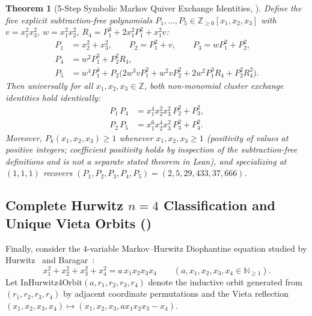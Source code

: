 \documentclass[11pt,reqno]{amsart}
\theoremstyle{plain}
\newtheorem{theorem}{Theorem}[section]
\theoremstyle{definition}
\newcommand{\ZZ}{\mathbb{Z}}
\newcommand{\NN}{\mathbb{N}}
\newcommand{\code}[1]{\texttt{\detokenize{#1}}}
\begin{document}
\begin{theorem}[5-Step Symbolic Markov Quiver Exchange Identities, \code{T3d}]
\label{thm:t3d}
Define the five explicit subtraction-free polynomials $P_1, \dots, P_5 \in \ZZ_{\ge 0}[x_1, x_2, x_3]$ with $v = x_1^2 x_3^2$, $w = x_1^2 x_2^2$, $R_4 = P_1^3 + 2 x_1^2 P_1^2 + x_1^2 v$:
\begin{align*}
  P_1 &= x_2^2 + x_3^2, \qquad P_2 = P_1^2 + v, \qquad P_3 = w P_1^2 + P_2^2, \\
  P_4 &= w^2 P_1^3 + P_2^2 R_4, \\
  P_5 &= w^4 P_1^4 + P_2\bigl(2 w^3 v P_1^2 + w^2 v P_2^2 + 2 w^2 P_1^3 R_4 + P_2^2 R_4^2\bigr).
\end{align*}
Then universally for all $x_1, x_2, x_3 \in \ZZ$, both non-monomial cluster exchange identities hold identically:
\begin{align}
  P_1\, P_4 &= x_1^4 x_2^2 x_3^2\, P_2^2 + P_3^2, \\
  P_2\, P_5 &= x_1^6 x_2^4 x_3^2\, P_3^2 + P_4^2.
\end{align}
Moreover, $P_k(x_1,x_2,x_3) \ge 1$ whenever $x_1,x_2,x_3 \ge 1$ (positivity of values at positive integers; coefficient positivity holds by inspection of the subtraction-free definitions and is not a separate stated theorem in Lean), and specializing at $(1,1,1)$ recovers $(P_1, P_2, P_3, P_4, P_5) = (2, 5, 29, 433, 37{,}666)$.
\end{theorem}

\subsection{Complete Hurwitz \texorpdfstring{$n=4$}{n=4} Classification and Unique Vieta Orbits (\texorpdfstring{\code{T3e}}{T3e})}

Finally, consider the $4$-variable Markov--Hurwitz Diophantine equation studied by Hurwitz~\cite{hurwitz1907} and Baragar~\cite{baragar1993}:
\begin{equation}
  x_1^2 + x_2^2 + x_3^2 + x_4^2 = a\, x_1 x_2 x_3 x_4 \qquad (a, x_1, x_2, x_3, x_4 \in \NN_{\ge 1}).
\end{equation}
Let $\mathrm{InHurwitz4Orbit}(a, r_1, r_2, r_3, r_4)$ denote the inductive orbit generated from $(r_1,r_2,r_3,r_4)$ by adjacent coordinate permutations and the Vieta reflection $(x_1,x_2,x_3,x_4) \mapsto (x_1,x_2,x_3, a x_1 x_2 x_3 - x_4)$.
\end{document}
